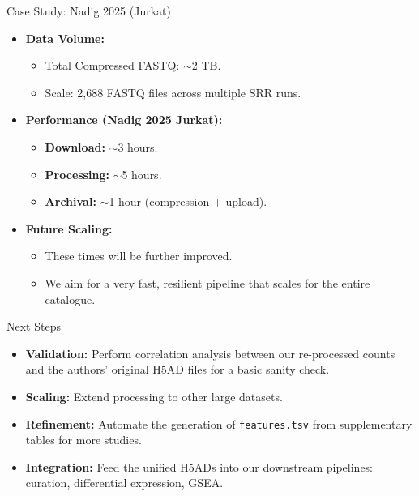 \documentclass[handout]{beamer}
\begin{document}
\begin{frame}{Case Study: Nadig 2025 (Jurkat)}
    \begin{itemize}
        \item \textbf{Data Volume:} 
            \begin{itemize}
                \item Total Compressed FASTQ: $\sim$2 TB.
                \item Scale: 2,688 FASTQ files across multiple SRR runs.
            \end{itemize}
        \item \textbf{Performance (Nadig 2025 Jurkat):} 
            \begin{itemize}
                \item \textbf{Download:} $\sim$3 hours.
                \item \textbf{Processing:} $\sim$5 hours.
                \item \textbf{Archival:} $\sim$1 hour (compression + upload).
            \end{itemize}
        \item \textbf{Future Scaling:} 
            \begin{itemize}
                \item These times will be further improved.
                \item We aim for a very fast, resilient pipeline that scales for the entire catalogue.
            \end{itemize}
    \end{itemize}
\end{frame}

\begin{frame}{Next Steps}
    \begin{itemize}
        \item \textbf{Validation:} Perform correlation analysis between our re-processed counts and the authors' original H5AD files for a basic sanity check.
        \item \textbf{Scaling:} Extend processing to other large datasets.
        \item \textbf{Refinement:} Automate the generation of \texttt{features.tsv} from supplementary tables for more studies.
        \item \textbf{Integration:} Feed the unified H5ADs into our downstream pipelines: curation, differential expression, GSEA.
    \end{itemize}
\end{frame}
\end{document}

